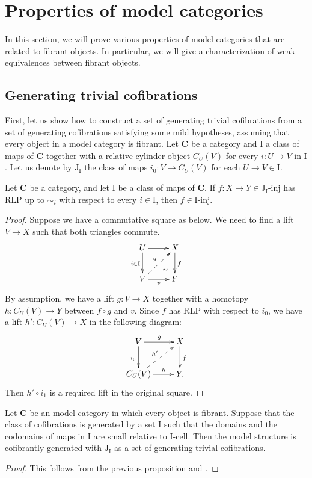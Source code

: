 \documentclass[reqno]{amsart}
\theoremstyle{definition}
\newcommand{\cat}[1]{\mathbf{#1}}
\newcommand{\C}{\cat{C}}
\newcommand{\I}{\mathrm{I}}
\newcommand{\J}{\mathrm{J}}
\newcommand{\class}[2]{#1\text{-}\mathrm{#2}}
\newcommand{\Iinj}[1][\I]{\class{#1}{inj}}
\newcommand{\Icell}[1][\I]{\class{#1}{cell}}
\newcommand{\Jinj}[1][]{\Iinj[\J#1]}
\newcommand{\cyli}{i}
\begin{document}
\section{Properties of model categories}

In this section, we will prove various properties of model categories that are related to fibrant objects.
In particular, we will give a characterization of weak equivalences between fibrant objects.

\subsection{Generating trivial cofibrations}

First, let us show how to construct a set of generating trivial cofibrations from a set of generating cofibrations satisfying some mild hypotheses,
assuming that every object in a model category is fibrant.
Let $\C$ be a category and $\I$ a class of maps of $\C$ together with a relative cylinder object $C_U(V)$ for every $i : U \to V$ in $\I$.
Let us denote by $\J_\I$ the class of maps $\cyli_0 : V \to C_U(V)$ for each $U \to V \in \I$.

\begin{prop}
Let $\C$ be a category, and let $\I$ be a class of maps of $\C$.
If $f : X \to Y \in \Jinj[_\I]$ has RLP up to $\sim_i$ with respect to every $i \in \I$, then $f \in \Iinj$.
\end{prop}
\begin{proof}
Suppose we have a commutative square as below.
We need to find a lift $V \to X$ such that both triangles commute.
\[ \xymatrix{ U \ar[d]_{i \in \I} \ar[r] \ar@{}[dr]|(.7){\sim} & X \ar[d]^f \\
              V \ar[r]_v \ar@{-->}[ur]^g                       & Y
            } \]
By assumption, we have a lift $g : V \to X$ together with
a homotopy $h : C_U(V) \to Y$ between $f \circ g$ and $v$.
Since $f$ has RLP with respect to $\cyli_0$, we have a lift $h' : C_U(V) \to X$ in the following diagram:
\[ \xymatrix{ V \ar[r]^g \ar[d]_{\cyli_0}         & X \ar[d]^f \\
              C_U(V) \ar[r]^-h \ar@{-->}[ur]^{h'} & Y.
            } \]
Then $h' \circ \cyli_1$ is a required lift in the original square.
\end{proof}

\begin{cor}
Let $\C$ be an model category in which every object is fibrant.
Suppose that the class of cofibrations is generated by a set $\I$ such that
the domains and the codomains of maps in $\I$ are small relative to $\Icell$.
Then the model structure is cofibrantly generated with $\J_\I$ as a set of generating trivial cofibrations.
\end{cor}
\begin{proof}
This follows from the previous proposition and .
\end{proof}
\end{document}
